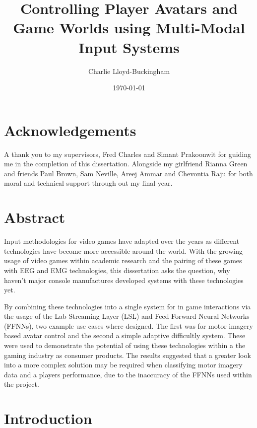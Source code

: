 \documentclass[11pt, a4paper]{article}
\title{Controlling Player Avatars and Game Worlds using Multi-Modal Input Systems}
\author{Charlie Lloyd-Buckingham}
\date{\today}
\begin{document}
\maketitle



\pagebreak
\section{Acknowledgements}	

A thank you to my supervisors, Fred Charles and Simant Prakoonwit for guiding me in the completion of this dissertation. Alongside my girlfriend Rianna Green and friends Paul Brown, Sam Neville, Areej Ammar and Chevontia Raju for both moral and technical support through out my final year.

\section{Abstract}	

Input methodologies for video games have adapted over the years as different technologies have become more accessible around the world. With the growing usage of video games within academic research and the pairing of these games with EEG and EMG technologies, this dissertation asks the question, why haven't major console manufactures developed systems with these technologies yet. 

\hfill

By combining these technologies into a single system for in game interactions via the usage of the Lab Streaming Layer (LSL) and Feed Forward Neural Networks (FFNNs), two example use cases where designed. The first was for motor imagery based avatar control and the second a simple adaptive difficultly system. These were used to demonstrate the potential of using these technologies within a the gaming industry as consumer products. The results suggested that a greater look into a more complex solution may be required when classifying motor imagery data and a players performance, due to the inaccuracy of the FFNNs used within the project.



\pagebreak
\tableofcontents				%



\pagebreak
\section{Introduction}	
\end{document}
